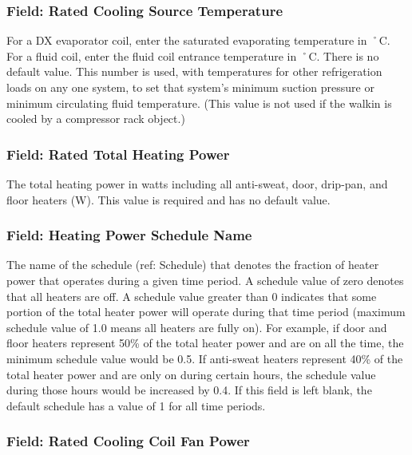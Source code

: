 \subsubsection{Field: Rated Cooling Source Temperature}\label{field-rated-cooling-source-temperature}

For a DX evaporator coil, enter the saturated evaporating temperature in ˚C.~ For a fluid coil, enter the fluid coil entrance temperature in ˚C. There is no default value. This number is used, with temperatures for other refrigeration loads on any one system, to set that system's minimum suction pressure or minimum circulating fluid temperature. (This value is not used if the walkin is cooled by a compressor rack object.)

\subsubsection{Field: Rated Total Heating Power}\label{field-rated-total-heating-power}

The total heating power in watts including all anti-sweat, door, drip-pan, and floor heaters (W). This value is required and has no default value.

\subsubsection{Field: Heating Power Schedule Name}\label{field-heating-power-schedule-name}

The name of the schedule (ref: Schedule) that denotes the fraction of heater power that operates during a given time period. A schedule value of zero denotes that all heaters are off. A schedule value greater than 0 indicates that some portion of the total heater power will operate during that time period (maximum schedule value of 1.0 means all heaters are fully on). For example, if door and floor heaters represent 50\% of the total heater power and are on all the time, the minimum schedule value would be 0.5. If anti-sweat heaters represent 40\% of the total heater power and are only on during certain hours, the schedule value during those hours would be increased by 0.4. If this field is left blank, the default schedule has a value of 1 for all time periods.

\subsubsection{Field: Rated Cooling Coil Fan Power}\label{field-rated-cooling-coil-fan-power}

